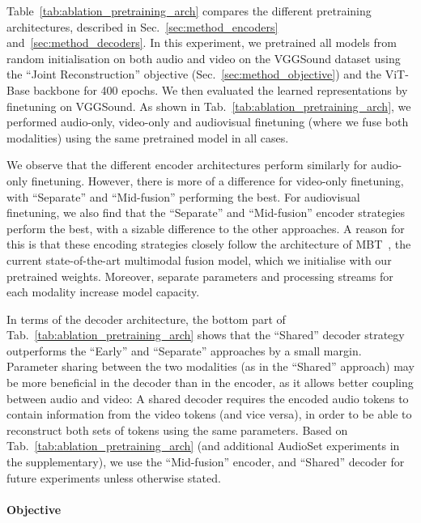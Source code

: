 \documentclass[10pt,twocolumn,letterpaper]{article}
\def \paravspace {-1\baselineskip}
\begin{document}
Table~\ref{tab:ablation_pretraining_arch} compares the different pretraining architectures, described in Sec.~\ref{sec:method_encoders} and~\ref{sec:method_decoders}.
In this experiment, we pretrained all models from random initialisation on both audio and video on the VGGSound dataset using the ``Joint Reconstruction'' objective (Sec.~\ref{sec:method_objective}) and the ViT-Base backbone for 400 epochs.
We then evaluated the learned representations by finetuning on VGGSound.
As shown in Tab.~\ref{tab:ablation_pretraining_arch}, we performed audio-only, video-only and audiovisual finetuning (where we fuse both modalities) using the same pretrained model in all cases.

We observe that the different encoder architectures perform similarly for audio-only finetuning.
However, there is more of a difference for video-only finetuning, with ``Separate'' and ``Mid-fusion'' performing the best.
For audiovisual finetuning, we also find that the ``Separate'' and ``Mid-fusion'' encoder strategies perform the best, with a sizable difference to the other approaches.
A reason for this is that these encoding strategies closely follow the architecture of MBT~\cite{nagrani2021attention}, the current state-of-the-art multimodal fusion model, which we initialise with our pretrained weights.
Moreover, separate parameters and processing streams for each modality increase model capacity. 

In terms of the decoder architecture, the bottom part of Tab.~\ref{tab:ablation_pretraining_arch} shows that the ``Shared'' decoder strategy outperforms the ``Early'' and ``Separate'' approaches by a small margin.
Parameter sharing between the two modalities (as in the ``Shared'' approach) may be more beneficial in the decoder than in the encoder, as it allows better coupling between audio and video: A shared decoder requires the encoded audio tokens to contain information from the video tokens (and vice versa), in order to be able to reconstruct both sets of tokens using the same parameters.
Based on Tab.~\ref{tab:ablation_pretraining_arch} (and additional AudioSet experiments in the supplementary), we use the ``Mid-fusion'' encoder, and ``Shared'' decoder for future experiments unless otherwise stated.



\vspace{\paravspace}
\paragraph{Objective}
\end{document}
